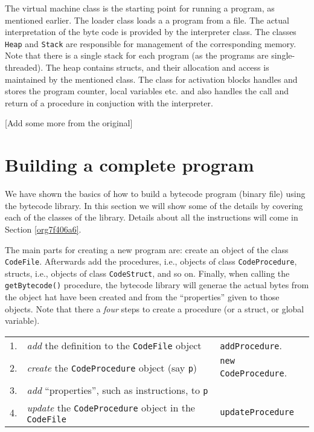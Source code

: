 \documentclass[11pt]{article}
\begin{document}
The virtual machine class is the starting point for running a program, as
mentioned earlier.  The loader class loads a a program from a file. The
actual interpretation of the byte code is provided by the interpreter
class. The classes \texttt{Heap} and \texttt{Stack} are responsible for management of the
corresponding memory. Note that there is a single stack for each program
(as the programs are single-threaded). The heap contains structs, and their
allocation and access is maintained by the mentioned class. The class for
activation blocks handles and stores the program counter, local variables
etc. and also handles the call and return of a procedure in conjuction with
the interpreter.


[Add some more from the original]


\section{Building a complete program}
\label{sec:org94183b9}
\label{orgf36f364}     

We have shown the basics of how to build a bytecode program (binary file)
using the bytecode library. In this section we will show some of the
details by covering each of the classes of the library. Details about all
the instructions will come in Section \ref{org7f406a6}.

The main parts for creating a new program are: create an object of the
class \texttt{CodeFile}. Afterwards add the procedures, i.e., objects of class
\texttt{CodeProcedure}, structs, i.e., objects of class \texttt{CodeStruct}, and so
on. Finally, when calling the \texttt{getBytecode()} procedure, the bytecode
library will generae the actual bytes from the object hat have been created
and from the ``properties'' given to those objects. Note that there a
\emph{four} steps to create a procedure (or a struct, or global variable).

\begin{center}
\begin{tabular}{rll}
 &  & \\
\hline
1. & \emph{add} the definition to the \texttt{CodeFile} object & \texttt{addProcedure}.\\
2. & \emph{create} the \texttt{CodeProcedure} object (say \texttt{p}) & \texttt{new CodeProcedure}.\\
3. & \emph{add} ``properties'', such as  instructions, to \texttt{p} & \\
4. & \emph{update} the \texttt{CodeProcedure} object in the \texttt{CodeFile} & \texttt{updateProcedure}\\
\end{tabular}

\end{center}
\end{document}
